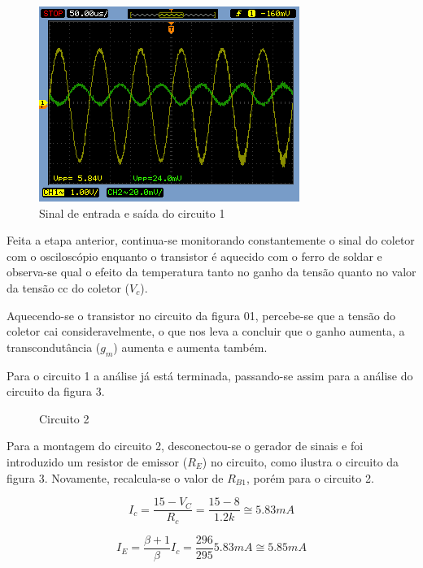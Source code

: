 \documentclass[a4paper]{article} %
\begin{document}
\begin{figure}[h!]
\begin{centering}
\includegraphics[scale=0.5]{figuras03/1_1} \caption{Sinal de entrada e saída do circuito 1 \label{fig:11}}
\par\end{centering}
\end{figure}


Feita a etapa anterior, continua-se monitorando constantemente o sinal do coletor
com o osciloscópio enquanto o transistor é aquecido com o ferro de soldar e observa-se qual o
efeito da temperatura tanto no ganho da tensão quanto no valor da tensão cc do coletor ($V_c$).

Aquecendo-se o transistor no circuito da figura 01, percebe-se que a tensão do coletor
cai consideravelmente, o que nos leva a concluir que o ganho aumenta, a transcondutância
($g_m$) aumenta e aumenta também.

Para o circuito 1 a análise já está terminada, passando-se assim para a análise do
circuito da figura 3.


\vspace{3mm}
\begin{figure}[h!]
\centerline{}
\caption{Circuito 2\label{circ:2}}
\end{figure}

Para a montagem do circuito 2, desconectou-se o gerador de sinais e foi introduzido
um resistor de emissor ($R_E$) no circuito, como ilustra o circuito da figura 3. Novamente,
recalcula-se o valor de $R_{B1}$, porém para o circuito 2.

\begin{displaymath}
I_c=\frac{15-V_C}{R_c}=\frac{15-8}{1.2k}\cong5.83mA
\end{displaymath}

\begin{displaymath}
I_E=\frac{\beta +1}{\beta}I_c=\frac{296}{295}5.83mA\cong5.85mA
\end{displaymath}
\end{document}
